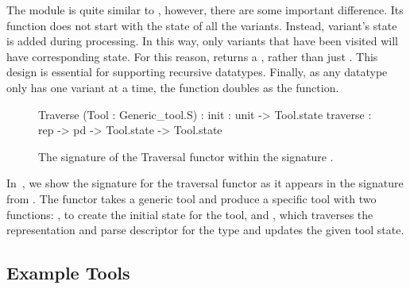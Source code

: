 The  module is quite similar to , however,
there are some important difference. Its  function does not
start with the state of all the variants. Instead, variant's state is
added during processing. In this way, only variants that have been
visited will have corresponding state. For this reason, 
returns a , rather than just . This design
is essential for supporting recursive datatypes. Finally, as any
datatype only has one variant at a time, the 
function doubles as the  function.

\begin{figure}
\begin{code}\scriptsize
   Traverse (Tool : Generic_tool.S) :
     init : unit -> Tool.state
     traverse : rep -> pd -> Tool.state -> Tool.state
\end{code}
\caption{The signature of the Traversal functor within the signature .}
\label{fig:traversal-interface}
\end{figure}

In~, we show the signature for the
traversal functor as it appears in the signature  from
. The functor takes a generic tool and produce
a specific tool with two functions: , to create the initial
state for the tool, and , which traverses the
representation and parse descriptor for the type and updates the given
tool state.

\subsection{Example Tools}
\label{sec:gentool-motivation-ex}


